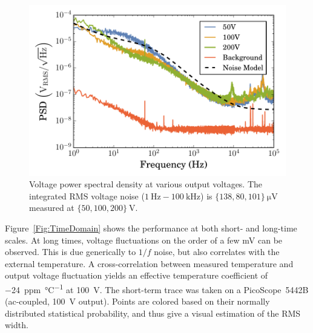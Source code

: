 \documentclass[aip,rsi,reprint]{revtex4-1} %
\begin{document}
\begin{figure}[hb]
\includegraphics[width=\columnwidth]{fig/VoltagePSD.pdf}
\caption{Voltage power spectral density at various output voltages. The integrated RMS voltage noise ($\SI{1}{\hertz} - \SI{100}{\kilo\hertz}$) is $\{138, 80, 101\}~\si{\micro\volt}$ measured at  $\{50, 100, 200\}~\si{\volt}$. \label{Fig:PSD}}
\end{figure}

Figure~\ref{Fig:TimeDomain} shows the performance at both short- and long-time scales.
At long times, voltage fluctuations on the order of a few \si{\milli\volt} can be observed.
This is due generically to $1/f$ noise, but also correlates with the external temperature.
A cross-correlation between measured temperature and output voltage fluctuation yields an effective temperature coefficient of \SI[per-mode=symbol]{-24}{ppm\per\celsius} at \SI{100}{\volt}.
The short-term trace was taken on a PicoScope~5442B (ac-coupled, \SI{100}{\volt} output).
Points are colored based on their normally distributed statistical probability, and thus give a visual estimation of the RMS width.
\end{document}

